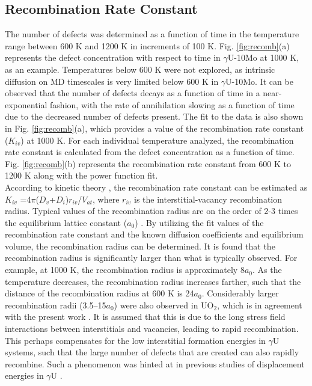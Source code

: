 \documentclass[preprint,12pt]{elsarticle}
\begin{document}
\subsection{Recombination Rate Constant}\label{sec:recomb}
The number of defects was determined as a function of time in the temperature range between 600 K and 1200 K in increments of 100 K. Fig. \ref{fig:recomb}(a) represents the defect concentration with respect to time in $\gamma$U-10Mo at 1000 K, as an example. Temperatures below 600 K were not explored, as intrinsic diffusion on MD timescales is very limited below 600 K in $\gamma$U-10Mo.  It can be observed that the number of defects decays as a function of time in a near-exponential fashion, with the rate of annihilation slowing as a function of time due to the decreased number of defects present. The fit to the data is also shown in Fig. \ref{fig:recomb}(a), which provides a value of the recombination rate constant ($K_{iv}$) at 1000 K. For each individual temperature analyzed, the recombination rate constant is calculated from the defect concentration as a function of time. Fig. \ref{fig:recomb}(b) represents the recombination rate constant from 600 K to 1200 K along with the power function fit.\\
\indent According to kinetic theory \cite{was2016fundamentals}, the recombination rate constant can be estimated as $K_{iv}$ =4$\pi$($D_{v}$+$D_{i}$)$r_{iv}$/$V_{at}$, where $r_{iv}$ is the interstitial-vacancy recombination radius. Typical values of the recombination radius are on the order of 2-3 times the equilibrium lattice constant ($a_{0}$) \cite{yu2012radiation, nakashima2015recombination}. By utilizing the fit values of the recombination rate constant and the known diffusion coefficients and equilibrium volume, the recombination radius can be determined. It is found that the recombination radius is significantly larger than what is typically observed. For example, at 1000 K, the recombination radius is approximately 8$a_{0}$. As the temperature decreases, the recombination radius increases farther, such that the distance of the recombination radius at 600 K is 24$a_{0}$. Considerably larger recombination radii (3.5–15$a_{0}$) were also observed in UO$_{2}$, which is in agreement with the present work \cite{veshchunov2015development}. It is assumed that this is due to the long stress field interactions between interstitials and vacancies, leading to rapid recombination. This perhaps compensates for the low interstitial formation energies in $\gamma$U systems, such that the large number of defects that are created can also rapidly recombine. Such a phenomenon was hinted at in previous studies of displacement energies in $\gamma$U \cite{beeler2018calculation}.
\end{document}
